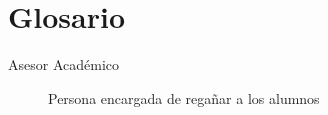 \documentclass[12pt,letterpaper,spanish]{report}
\begin{document}
\newpage

\appendix

%







\newpage
\chapter{Glosario}

\begin{description}
  \item[Asesor Académico] Persona encargada de regañar a los alumnos
\end{description}

\end{document}
